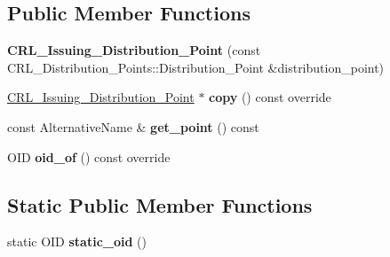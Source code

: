 \subsection*{Public Member Functions}
\begin{DoxyCompactItemize}
\item 
\mbox{\label{class_botan_1_1_cert___extension_1_1_c_r_l___issuing___distribution___point_aa16a0aef2b4c8682956fce23ff3f4fb0}} 
{\bfseries C\+R\+L\+\_\+\+Issuing\+\_\+\+Distribution\+\_\+\+Point} (const C\+R\+L\+\_\+\+Distribution\+\_\+\+Points\+::\+Distribution\+\_\+\+Point \&distribution\+\_\+point)
\item 
\mbox{\label{class_botan_1_1_cert___extension_1_1_c_r_l___issuing___distribution___point_ae90391b3deda4e6f8b42b143c54d383a}} 
\hyperlink{class_botan_1_1_cert___extension_1_1_c_r_l___issuing___distribution___point}{C\+R\+L\+\_\+\+Issuing\+\_\+\+Distribution\+\_\+\+Point} $\ast$ {\bfseries copy} () const override
\item 
\mbox{\label{class_botan_1_1_cert___extension_1_1_c_r_l___issuing___distribution___point_ab04b8e7583b72d7bbf75163181127ec5}} 
const Alternative\+Name \& {\bfseries get\+\_\+point} () const
\item 
\mbox{\label{class_botan_1_1_cert___extension_1_1_c_r_l___issuing___distribution___point_a31810e32708497aa4f926bf04316f968}} 
O\+ID {\bfseries oid\+\_\+of} () const override
\end{DoxyCompactItemize}
\subsection*{Static Public Member Functions}
\begin{DoxyCompactItemize}
\item 
\mbox{\label{class_botan_1_1_cert___extension_1_1_c_r_l___issuing___distribution___point_aade07378961504397ff8e7917442a18a}} 
static O\+ID {\bfseries static\+\_\+oid} ()
\end{DoxyCompactItemize}


